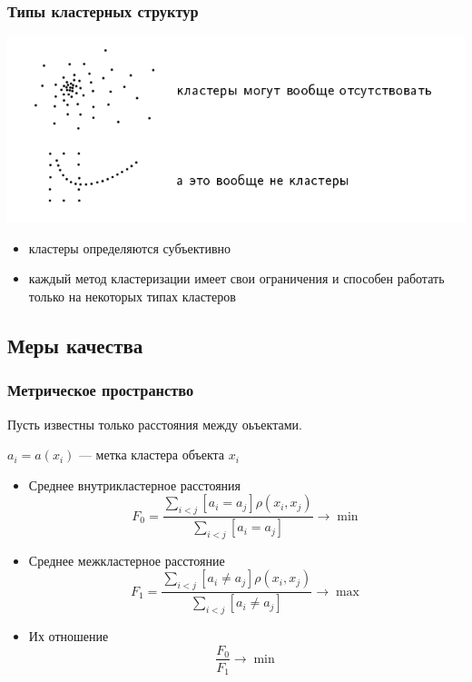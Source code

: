 \documentclass{beamer}
\begin{document}
	\begin{frame}
		\frametitle{Типы кластерных структур}

		\includegraphics[width=1\textwidth]{img/struct_2.png}

		\begin{itemize}
			\item  кластеры определяются субъективно
			\item каждый метод кластеризации имеет свои ограничения
			и способен работать только на некоторых типах кластеров
		\end{itemize}

	\end{frame}

	\subsection{Меры качества}

	\begin{frame}
		\frametitle{Метрическое пространство}

		Пусть известны только расстояния между оьъектами.

		$a_i = a(x_i)$ --- метка кластера объекта $x_i$

		\begin{itemize}
			\item Среднее внутрикластерное расстояния
			\[
				F_0 = \frac{\sum_{i < j}[a_i = a_j] \rho(x_i, x_j)}
				{\sum_{i < j}[a_i = a_j]} \rightarrow \min
			\]
			\item Среднее межкластерное расстояние
			\[
				F_1 = \frac{\sum_{i < j}[a_i \ne a_j] \rho(x_i, x_j)}
				{\sum_{i < j}[a_i \ne a_j]} \rightarrow \max
			\]
			\item Их отношение
			\[
				\frac{F_0}{F_1} \rightarrow \min
			\]
		\end{itemize}
	\end{frame}
\end{document}
